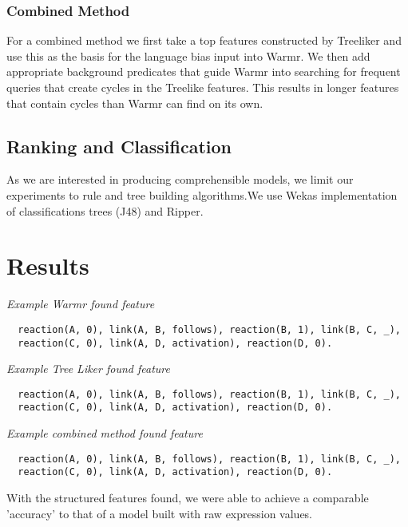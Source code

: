 \documentclass[runningheads,a4paper]{llncs}
\begin{document}
\subsubsection{Combined Method}
For a combined method we first take a top features constructed by Treeliker and use this as the basis for the language bias input into Warmr. We then add appropriate background predicates that guide Warmr into searching for frequent queries that create cycles in the Treelike features. This results in longer features that contain cycles than Warmr can find on its own. 
	     
\subsection{Ranking and Classification}
As we are interested in producing comprehensible models, we limit our experiments to rule and tree building algorithms.We use Wekas implementation of classifications trees (J48) and Ripper. 
	     
\section{Results}

\noindent
{\it{Example Warmr found feature}}

\begin{verbatim}
  reaction(A, 0), link(A, B, follows), reaction(B, 1), link(B, C, _),    
  reaction(C, 0), link(A, D, activation), reaction(D, 0).
\end{verbatim}

\noindent
{\it{Example Tree Liker found feature}}

\begin{verbatim}
  reaction(A, 0), link(A, B, follows), reaction(B, 1), link(B, C, _),    
  reaction(C, 0), link(A, D, activation), reaction(D, 0).
\end{verbatim}

\noindent
{\it{Example combined method found feature}}

\begin{verbatim}
  reaction(A, 0), link(A, B, follows), reaction(B, 1), link(B, C, _),    
  reaction(C, 0), link(A, D, activation), reaction(D, 0).
\end{verbatim}

With the structured features found, we were able to achieve a comparable 'accuracy' to that of a model built with raw expression values. 
\end{document}

